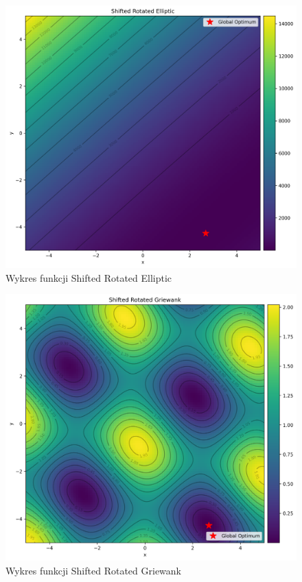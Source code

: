 \documentclass{article}
\begin{document}
\begin{figure}[H]
    \centering
    \includegraphics[width=\textwidth]{shifted_rotated_elliptic.png}
    \caption{Wykres funkcji Shifted Rotated Elliptic}
    \label{fig:plot3}
\end{figure}

\begin{figure}[H]
    \centering
    \includegraphics[width=\textwidth]{shifted_rotated_griewank.png}
    \caption{Wykres funkcji Shifted Rotated Griewank}
    \label{fig:plot4}
\end{figure}
\end{document}
